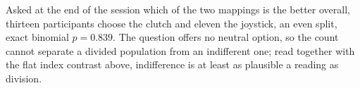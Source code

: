Asked at the end of the session which of the two mappings is the better overall, thirteen participants choose the clutch and eleven the joystick, an even split, exact binomial $p = 0.839$. The question offers no neutral option, so the count cannot separate a divided population from an indifferent one; read together with the flat index contrast above, indifference is at least as plausible a reading as division.

